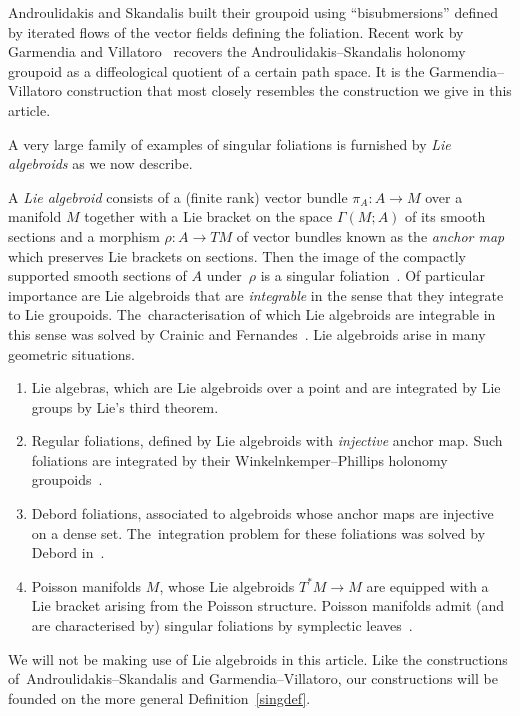 \documentclass[10pt,a4paper]{amsart}
\numberwithin{equation}{section}
\begin{document}
Androulidakis and Skandalis built their groupoid using ``bisubmersions'' defined by iterated flows of the vector fields defining the foliation. Recent work by Garmendia and Villatoro~\cite{VilGar1} recovers the Androulidakis--Skandalis holonomy groupoid as a diffeological quotient of a certain path space. It is the Garmendia--Villatoro construction that most closely resembles the construction we give in this article.

A very large family of examples of singular foliations is furnished by \textit{Lie algebroids} as we now describe.

\begin{Example}%
A \textit{Lie algebroid} consists of a (finite rank) vector bundle $\pi_{A}\colon A\rightarrow M$ over a manifold $M$ together with a Lie bracket on the space $\Gamma(M;A)$ of its smooth sections and a morphism $\rho\colon A\rightarrow TM$ of vector bundles known as the \textit{anchor map} which preserves Lie brackets on sections. Then the image of the compactly supported smooth sections of $A$ under~$\rho$ is a singular foliation~\cite[Example 1.3]{iakovos2}. Of particular importance are Lie algebroids that are \textit{integrable} in the sense that they integrate to Lie groupoids. The~characterisation of which Lie algebroids are integrable in this sense was solved by Crainic and Fernandes~\cite{cf2}. Lie algebroids arise in many geometric situations.
\begin{enumerate}\itemsep=0pt
\item Lie algebras, which are Lie algebroids over a point and are integrated by Lie groups by Lie's third theorem.
\item Regular foliations, defined by Lie algebroids with \textit{injective} anchor map. Such foliations are integrated by their Winkelnkemper--Phillips holonomy groupoids~\cite{holimper,wink}.
\item Debord foliations, associated to algebroids whose anchor maps are injective on a dense set. The~integration problem for these foliations was solved by Debord in~\cite{debord, debord2}.
\item Poisson manifolds $M$, whose Lie algebroids $T^{*}M\rightarrow M$ are equipped with a Lie bracket arising from the Poisson structure. Poisson manifolds admit (and are characterised by) singular foliations by symplectic leaves~\cite[p.~113]{cf2}.
\end{enumerate}
\end{Example}

We will not be making use of Lie algebroids in this article. Like the constructions of~And\-rou\-lidakis--Skandalis and Garmendia--Villatoro, our constructions will be founded on the more general Definition~\ref{singdef}.
\end{document}
